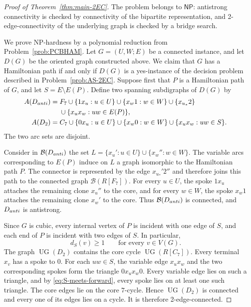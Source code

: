 \documentclass[10pt,a4paper]{amsart}
\newcommand{\NP}{\mathsf{NP}}
\newcommand{\UG}{\operatorname{UG}}
\newcommand{\cB}{\mathcal{B}}
\begin{document}
\begin{proof}[Proof of Theorem~\ref{thm:main-2EC}]
The problem belongs to $\NP$: antistrong connectivity is checked by connectivity of the bipartite representation, and 2-edge-connectivity of the underlying graph is checked by a bridge
search.

We prove NP-hardness by a polynomial reduction from
Problem~\ref{prob:PCBHAM}.  Let $G=(U,W;E)$ be a connected instance,
and let $D(G)$ be the oriented graph constructed above.  We claim that $G$ has a Hamiltonian path if and only if $D(G)$ is a yes-instance of the decision problem described in
Problem~\ref{prob:AS-2EC}.
Suppose first that $P$ is a Hamiltonian path of $G$, and let $S=E\setminus E(P)$.  Define two spanning subdigraphs of $D(G)$ by
\begin{align*}
 A(D_{\rm anti})={}&F_7
   \cup\{1x_u:u\in U\}
   \cup\{x_w1:w\in W\}
   \cup\{x_{u_*}2\}\\
   &\cup\{x_ux_w:uw\in E(P)\},\\
 A(D_2)={}&C_7
   \cup\{0x_u:u\in U\}
   \cup\{x_w0:w\in W\}
   \cup\{x_ux_w:uw\in S\}.
\end{align*}
The two arc sets are disjoint.

Consider in $\cB(D_{\rm anti})$ the set $L=\{x_u':u\in U\}\cup\{x_w'':w\in W\}$.
The variable arcs corresponding to $E(P)$ induce on $L$ a graph
isomorphic to the Hamiltonian path $P$.  The connector is represented
by the edge $x_{u_*}'2''$ and therefore joins this path to the
connected graph $\cB(R[F_7])$.  For every $u\in U$, the spoke $1x_u$
attaches the remaining clone $x_u''$ to the core, and for every
$w\in W$, the spoke $x_w1$ attaches the remaining clone $x_w'$ to the
core.  Thus $\cB(D_{\rm anti})$ is connected, and
$D_{\rm anti}$ is antistrong.

Since $G$ is cubic, every internal vertex of $P$ is incident with one
edge of $S$, and each end of $P$ is incident with two edges of $S$.
In particular,
\begin{equation}\label{eq:S-meets-forward}
   d_S(v)\ge 1\qquad\text{for every }v\in V(G).
\end{equation}
The graph $\UG(D_2)$ contains the core cycle $\UG(R[C_7])$.  Every terminal $x_v$ has a spoke to $0$.  For each $uw\in S$, the variable
edge $x_ux_w$ and the two corresponding spokes form the triangle $0x_ux_w0$.
Every variable edge lies on such a triangle, and by
\eqref{eq:S-meets-forward}, every spoke lies on at least one such
triangle.  The core edges lie on the core $7$-cycle.  Hence
$\UG(D_2)$ is connected and every one of its edges lies on a cycle.
It is therefore 2-edge-connected.


\end{proof}
\end{document}
